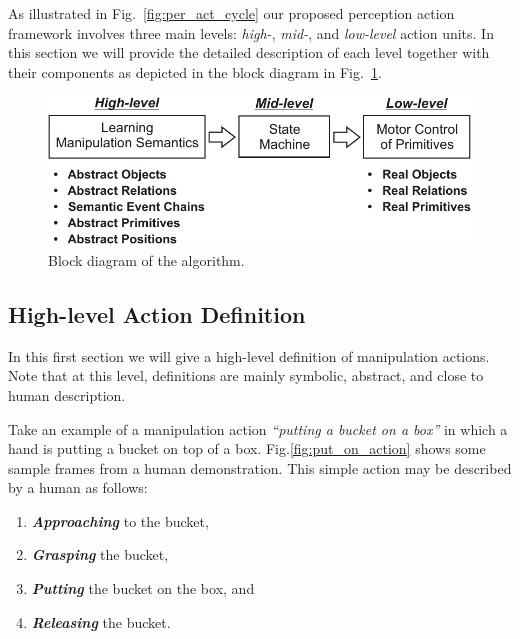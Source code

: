 As illustrated in Fig.~\ref{fig:per_act_cycle} our proposed perception action framework involves three main levels: {\it high-}, {\it mid-}, and {\it low-level} action units. In this section we will provide the detailed description of each level together with their components as depicted in the block diagram in Fig.~\ref{fig:blockdiagram}.
  
  
 \begin{figure}[!t]
      \centering
      \includegraphics[scale=0.62]{./pdf/Figure_BlockDiagram.pdf}
      \caption{ Block diagram of the algorithm.}
      \label{fig:blockdiagram}
\end{figure}

 

\subsection{High-level Action Definition}
\label{sec:high-level}

In this first section we will give a high-level definition of manipulation actions. Note that at this level, definitions are mainly symbolic, abstract, and close to human description.


Take an example of a manipulation action   {\it ``putting a bucket on a box''} in which a hand is putting a bucket on top of a box.  Fig.\ref{fig:put_on_action} shows some sample frames from a human demonstration.
This simple action may be described by a human as follows:

\begin{enumerate}
  \item \textbf{\textit{Approaching}} to the bucket,
  \item \textbf{\textit{Grasping}} the bucket,
  \item \textbf{\textit{Putting}} the bucket on the box, and
  \item \textbf{\textit{Releasing}} the bucket.
\end{enumerate}

